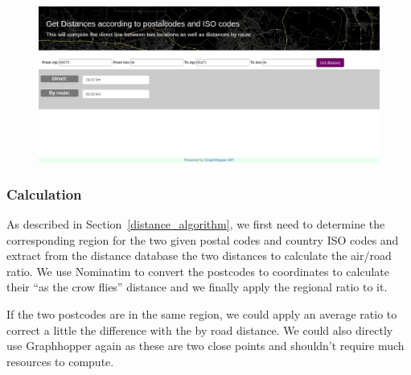 \begin{figure}[H]
\hspace{-2.0cm}
\includegraphics[width=1.3\textwidth]{img/webapp}
\label{fig:webapp}
\end{figure}

\subsubsection{Calculation}

As described in Section~\ref{distance_algorithm}, we first need to determine the
corresponding region for the two given postal codes and country ISO codes and
extract from the distance database the two distances to calculate the air/road ratio.
We use Nominatim to convert the postcodes to coordinates to calculate their
``as the crow flies'' distance and we finally apply the regional ratio to it.

If the two postcodes are in the same region, we could apply an average ratio to
correct a little the difference with the by road distance. We could also directly
use Graphhopper again as these are two close points and shouldn't require much
resources to compute.
